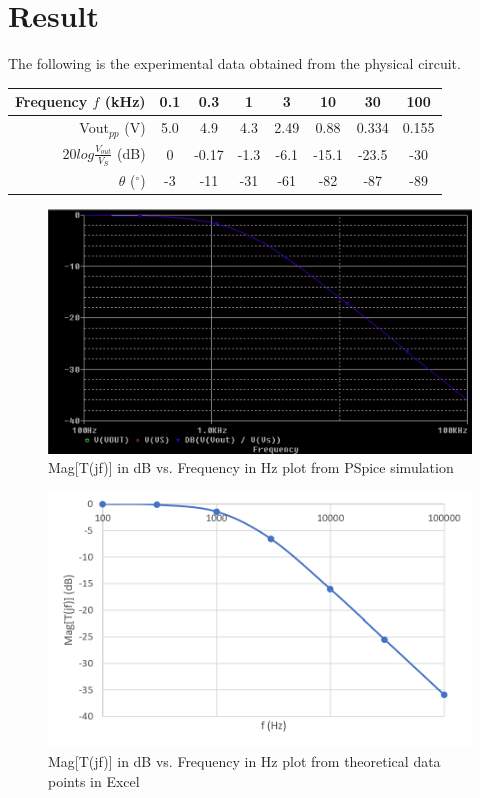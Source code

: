 \documentclass{article}
\begin{document}
\section*{Result}
The following is the experimental data obtained from the physical circuit.
\begin{table}[H]
  \begin{tabular}{r|ccccccc}
      \toprule
      Frequency $\mathit{f}$ (kHz) & 0.1 & 0.3 & 1 & 3 & 10 & 30 & 100\\
      \midrule
      Vout$_{pp}$ (V)& 5.0 & 4.9 & 4.3 & 2.49 & 0.88 & 0.334 & 0.155 \\
      $20log\frac{V_{out}}{V_{S}}$ (dB)& 0 & -0.17 & -1.3 & -6.1 & -15.1 & -23.5 & -30 \\
      $\theta$ ($^\circ$)& -3 & -11 & -31 & -61 & -82 & -87 & -89 \\
      \bottomrule
  \end{tabular}
\end{table}
\begin{figure}[H]
  \centering
  \includegraphics[width=\textwidth]{ECE2200_Lab1_pspice.png}
  \caption{Mag[T(jf)] in dB vs. Frequency in Hz plot from PSpice simulation}
\end{figure}
\begin{figure}[H]
  \centering
  \includegraphics[width=\textwidth]{ECE2200_Lab1_excel.png}
  \caption{Mag[T(jf)] in dB vs. Frequency in Hz plot from theoretical data points in Excel}
\end{figure}
\end{document}
